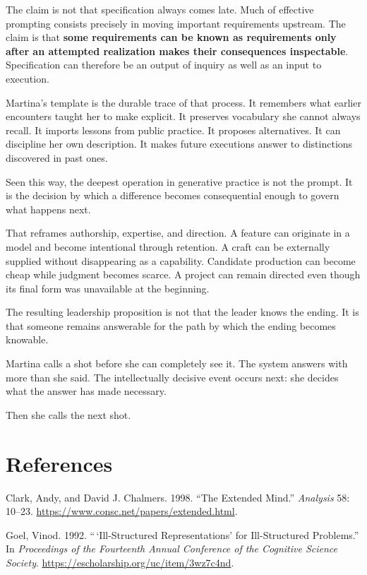 \documentclass[
  11pt,
  letterpaper,
]{article}
\begin{document}
The claim is not that specification always comes late. Much of effective
prompting consists precisely in moving important requirements upstream.
The claim is that \textbf{some requirements can be known as requirements
only after an attempted realization makes their consequences
inspectable}. Specification can therefore be an output of inquiry as
well as an input to execution.

Martina's template is the durable trace of that process. It remembers
what earlier encounters taught her to make explicit. It preserves
vocabulary she cannot always recall. It imports lessons from public
practice. It proposes alternatives. It can discipline her own
description. It makes future executions answer to distinctions
discovered in past ones.

Seen this way, the deepest operation in generative practice is not the
prompt. It is the decision by which a difference becomes consequential
enough to govern what happens next.

That reframes authorship, expertise, and direction. A feature can
originate in a model and become intentional through retention. A craft
can be externally supplied without disappearing as a capability.
Candidate production can become cheap while judgment becomes scarce. A
project can remain directed even though its final form was unavailable
at the beginning.

The resulting leadership proposition is not that the leader knows the
ending. It is that someone remains answerable for the path by which the
ending becomes knowable.

Martina calls a shot before she can completely see it. The system
answers with more than she said. The intellectually decisive event
occurs next: she decides what the answer has made necessary.

Then she calls the next shot.

\newpage

\section{References}\label{references}

Clark, Andy, and David J. Chalmers. 1998. ``The Extended Mind.''
\emph{Analysis} 58: 10--23.
\url{https://www.consc.net/papers/extended.html}.

Goel, Vinod. 1992. ``\,`Ill-Structured Representations' for
Ill-Structured Problems.'' In \emph{Proceedings of the Fourteenth Annual
Conference of the Cognitive Science Society}.
\url{https://escholarship.org/uc/item/3wz7c4nd}.
\end{document}
